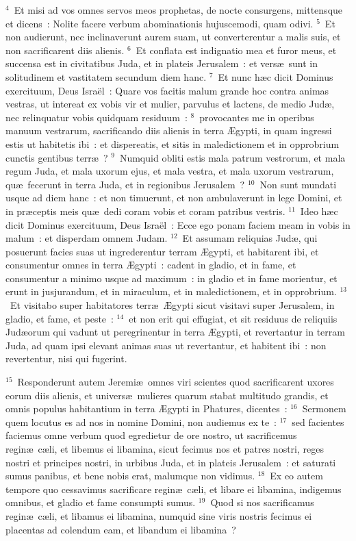 ${}^{4}$~Et misi ad vos omnes servos meos prophetas, de nocte consurgens, mittensque et dicens~: Nolite facere verbum abominationis hujuscemodi, quam odivi.
${}^{5}$~Et non audierunt, nec inclinaverunt aurem suam, ut converterentur a malis suis, et non sacrificarent diis alienis.
${}^{6}$~Et conflata est indignatio mea et furor meus, et succensa est in civitatibus Juda, et in plateis Jerusalem~: et vers\ae\ sunt in solitudinem et vastitatem secundum diem hanc.
${}^{7}$~Et nunc h\ae c dicit Dominus exercituum, Deus Isra\"el~: Quare vos facitis malum grande hoc contra animas vestras, ut intereat ex vobis vir et mulier, parvulus et lactens, de medio Jud\ae , nec relinquatur vobis quidquam residuum~:
${}^{8}$~provocantes me in operibus manuum vestrarum, sacrificando diis alienis in terra \AE gypti, in quam ingressi estis ut habitetis ibi~: et dispereatis, et sitis in maledictionem et in opprobrium cunctis gentibus terr\ae~?
${}^{9}$~Numquid obliti estis mala patrum vestrorum, et mala regum Juda, et mala uxorum ejus, et mala vestra, et mala uxorum vestrarum, qu\ae\ fecerunt in terra Juda, et in regionibus Jerusalem~?
${}^{10}$~Non sunt mundati usque ad diem hanc~: et non timuerunt, et non ambulaverunt in lege Domini, et in pr\ae ceptis meis qu\ae\ dedi coram vobis et coram patribus vestris.
${}^{11}$~Ideo h\ae c dicit Dominus exercituum, Deus Isra\"el~: Ecce ego ponam faciem meam in vobis in malum~: et disperdam omnem Judam.
${}^{12}$~Et assumam reliquias Jud\ae , qui posuerunt facies suas ut ingrederentur terram \AE gypti, et habitarent ibi, et consumentur omnes in terra \AE gypti~: cadent in gladio, et in fame, et consumentur a minimo usque ad maximum~: in gladio et in fame morientur, et erunt in jusjurandum, et in miraculum, et in maledictionem, et in opprobrium.
${}^{13}$~Et visitabo super habitatores terr\ae\ \AE gypti sicut visitavi super Jerusalem, in gladio, et fame, et peste~:
${}^{14}$~et non erit qui effugiat, et sit residuus de reliquiis Jud\ae orum qui vadunt ut peregrinentur in terra \AE gypti, et revertantur in terram Juda, ad quam ipsi elevant animas suas ut revertantur, et habitent ibi~: non revertentur, nisi qui fugerint.


${}^{15}$~Responderunt autem Jeremi\ae\ omnes viri scientes quod sacrificarent uxores eorum diis alienis, et univers\ae\ mulieres quarum stabat multitudo grandis, et omnis populus habitantium in terra \AE gypti in Phatures, dicentes~:
${}^{16}$~Sermonem quem locutus es ad nos in nomine Domini, non audiemus ex te~:
${}^{17}$~sed facientes faciemus omne verbum quod egredietur de ore nostro, ut sacrificemus regin\ae\ c\ae li, et libemus ei libamina, sicut fecimus nos et patres nostri, reges nostri et principes nostri, in urbibus Juda, et in plateis Jerusalem~: et saturati sumus panibus, et bene nobis erat, malumque non vidimus.
${}^{18}$~Ex eo autem tempore quo cessavimus sacrificare regin\ae\ c\ae li, et libare ei libamina, indigemus omnibus, et gladio et fame consumpti sumus.
${}^{19}$~Quod si nos sacrificamus regin\ae\ c\ae li, et libamus ei libamina, numquid sine viris nostris fecimus ei placentas ad colendum eam, et libandum ei libamina~?


